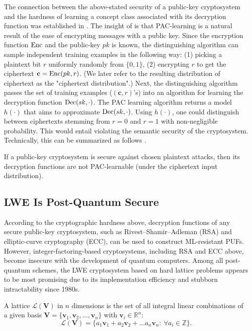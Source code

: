 The connection between the above-stated security of a public-key cryptosystem and the hardness of learning a concept class associated with its decryption function was established in \cite{kearns1994cryptographic,klivans2006cryptographic}. 
The insight of \cite{kearns1994cryptographic,klivans2006cryptographic} is that PAC-learning is a natural result of the ease of encrypting messages with a  public key. 
Since the encryption function $\Enc$ and the public-key $pk$ is known, the distinguishing algorithm can sample independent training examples in the following way: (1) picking a plaintext bit $r$ uniformly randomly from $\{0,1\}$, (2) encrypting $r$ to get the ciphertext $\mathbf{c}=\Enc(pk,r)$. (We later refer to the resulting distribution of ciphertext as the "ciphertext distribution".)
Next, the distinguishing algorithm passes the set of training examples ($(\mathbf{c},r)$'s) into an algorithm for learning the decryption function $\Dec(sk,\cdot)$.
The PAC learning algorithm returns a model $h(\cdot)$ that aims to approximate $\Dec(sk,\cdot)$. 
Using $h(\cdot)$, one could distinguish between ciphertexts stemming from $r=0$ and $r=1$ with non-negligible probability. 
This would entail violating the semantic security of the cryptosystem. 
Technically, this can be summarized as follows \cite{kearns1994cryptographic,klivans2006cryptographic}.
\begin{theorem}
\label{thm:crypto_hardness}
If a public-key cryptosystem is secure against chosen plaintext attacks, then its decryption functions are not PAC-learnable (under the ciphertext input distribution).
\end{theorem}


\subsection{LWE Is Post-Quantum Secure}
\label{sec:lwe_crypto}
According to the cryptographic hardness above, decryption functions of any secure public-key cryptosystem, such as Rivest–Shamir–Adleman (RSA) and elliptic-curve cryptography (ECC), can be used to construct ML-resistant PUFs. 
However, integer-factoring-based cryptosystems, including RSA and ECC above, become insecure with the development of quantum computers. 
Among all post-quantum schemes, %
the LWE cryptosystem based on hard lattice problems appears to be most promising due to its implementation efficiency and stubborn intractability since 1980s. 

A lattice $\mathcal{L}(\mathbf{V})$ in $n$ dimensions is the set of all integral linear combinations of a given basis $\mathbf{V}=\{\mathbf{v}_1,\mathbf{v}_2,\ldots, \mathbf{v}_n\}$ with $\mathbf{v}_i \in \mathbb{R}^n$:
\begin{equation*}
\mathcal{L}(\mathbf{V}) = \{a_1\mathbf{v}_1 + a_2\mathbf{v}_2+\ldots a_n\mathbf{v}_n: \: \forall a_i \in \mathbb{Z}\}.
\end{equation*}

